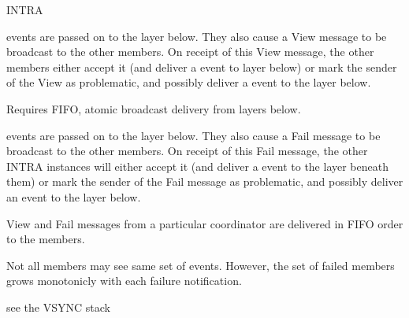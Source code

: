 \begin{Layer}{INTRA}
\begin{Properties}
\item
{} events are passed on to the layer below.  They also cause a
View message to be broadcast to the other members.  On receipt of this
View message, the other members either accept it (and deliver a
 event to layer below) or mark the sender of the View as
problematic, and possibly deliver a  event to the layer
below.
\item
Requires FIFO, atomic broadcast delivery from layers below.
\item
{} events are passed on to the layer below.  They also cause a Fail
message to be broadcast to the other members.  On receipt of this Fail
message, the other INTRA instances will either accept it (and deliver a
 event to the layer beneath them) or mark the sender of the Fail
message as problematic, and possibly deliver an  event to the
layer below.
\item
View and Fail messages from a particular coordinator are delivered in FIFO
order to the members.
\item
Not all members may see same set of  events.  However, the set of
failed members grows monotonicly with each failure notification.
\end{Properties}

\begin{Sources}
\end{Sources}

\begin{GenEvent}
\end{GenEvent}

\begin{Testing}
\item
see the VSYNC stack
\end{Testing}
\end{Layer}

